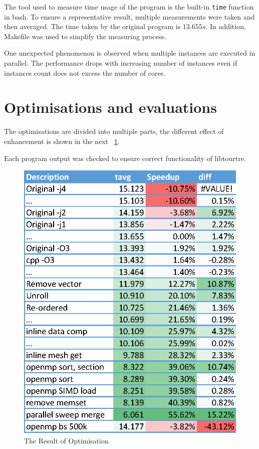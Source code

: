 \documentclass[conference]{IEEEtran}
\newcommand{\fref}[1]{\figurename~\ref{#1}}
\begin{document}
The tool used to measure time usage of the program is the built-in \texttt{time} function in bash. To ensure a representative result, multiple measurements were taken and then averaged. The time taken by the original program is $13.655 s$. In addition, Makefile was used to simplify the measuring process.

One unexpected phenomenon is observed when multiple instances are executed in parallel. The performance drops with increasing number of instances even if instances count does not excess the number of cores.

\section{Optimisations and evaluations}

The optimisations are divided into multiple parts, the different effect of enhancement is shown in the next \fref{fig:log}. 

Each program output was checked to ensure correct functionality of libtourtre.

\begin{figure}[t]
	\centering
	\includegraphics[width=\columnwidth]{data_log}
	\caption{The Result of Optimisation}
	\label{fig:log}
\end{figure}
\end{document}
